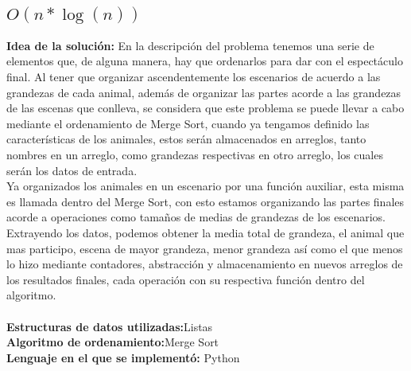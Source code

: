 \documentclass{article}
\begin{document}
		\subsection{$O(n*\log(n))$}
			\textbf{Idea de la solución:}
			En la descripción del problema tenemos una serie de elementos que, de alguna manera, hay que ordenarlos para dar con el espectáculo 
			final. Al tener que organizar ascendentemente los escenarios de acuerdo a las grandezas de cada animal, además de organizar las partes
			acorde a las grandezas de las escenas que conlleva, se considera que este problema se puede llevar a cabo mediante el ordenamiento de Merge Sort,
			cuando ya tengamos definido las características de los animales, estos serán almacenados en arreglos, tanto nombres en un arreglo, 
			como grandezas respectivas en otro arreglo, los cuales serán los datos de entrada.\\
			Ya organizados los animales en un escenario por una función auxiliar, esta misma es llamada dentro del Merge Sort,
			con esto estamos organizando las partes finales acorde a operaciones como tamaños de medias de grandezas de los escenarios. 
			Extrayendo los datos, podemos obtener la media total de grandeza, el animal que mas participo, escena de mayor grandeza, 
			menor grandeza así como el que menos lo hizo mediante contadores, abstracción y almacenamiento en nuevos arreglos de 
			los resultados finales, cada operación con su respectiva función dentro del algoritmo.\\\\
			\textbf{Estructuras de datos utilizadas:}Listas \\
			\textbf{Algoritmo de ordenamiento:}Merge Sort\\
			\textbf{Lenguaje en el que se implementó:} Python\\
\end{document}
